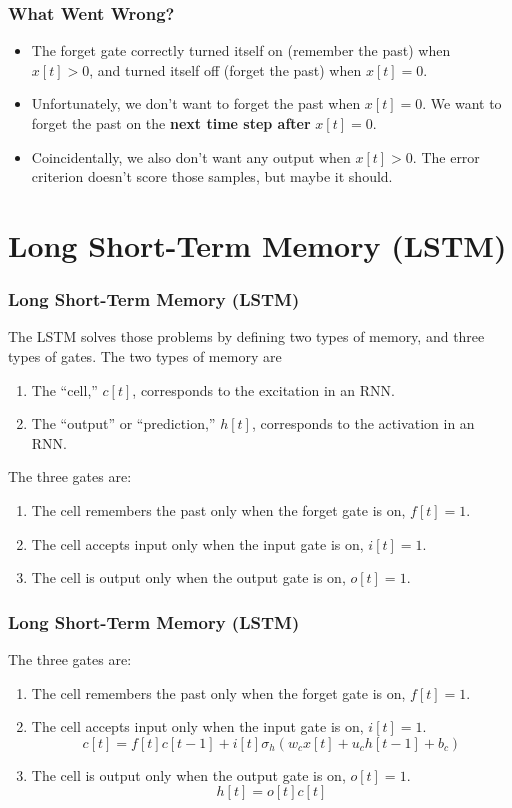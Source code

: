 \documentclass{beamer}
\begin{document}
\begin{frame}
  \frametitle{What Went Wrong?}
  \begin{itemize}
    \item The forget gate correctly turned itself on (remember the
      past) when $x[t]>0$, and turned itself off (forget the past)
      when $x[t]=0$.
    \item Unfortunately, we don't want to forget the past when
      $x[t]=0$.  We want to forget the past on the {\bf next time step
      after} $x[t]=0$.
    \item Coincidentally, we also don't want any output when $x[t]>0$.
      The error criterion doesn't score those samples, but maybe it
      should.
  \end{itemize}
\end{frame}

\section[LSTM]{Long Short-Term Memory (LSTM)}
\setcounter{subsection}{1}

\begin{frame}
  \frametitle{Long Short-Term Memory (LSTM)}

  The LSTM solves those problems by defining two types of memory, and
  three types of gates.  The two types of memory are
  \begin{enumerate}
  \item The ``cell,'' $c[t]$, corresponds to the excitation in an RNN.
  \item The ``output'' or ``prediction,'' $h[t]$, corresponds to the activation in an RNN.
  \end{enumerate}
  The three gates are:
  \begin{enumerate}
  \item The cell remembers the past only when the forget gate is on, $f[t]=1$.
  \item The cell accepts input only when the input gate is on, $i[t]=1$.
  \item The cell is output only when the output gate is on, $o[t]=1$.
  \end{enumerate}
\end{frame}
  
\begin{frame}
  \frametitle{Long Short-Term Memory (LSTM)}
  The three gates are:
  \begin{enumerate}
  \item The cell remembers the past only when the forget gate is on, $f[t]=1$.
  \item The cell accepts input only when the input gate is on, $i[t]=1$.
    \[
    c[t] = f[t]c[t-1] + i[t]\sigma_h\left(w_cx[t]+u_ch[t-1]+b_c\right)
    \]
  \item The cell is output only when the output gate is on, $o[t]=1$.
    \[
    h[t] = o[t]c[t]
    \]
  \end{enumerate}
\end{frame}
  
\end{document}
